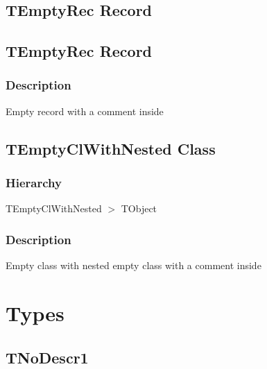\documentclass{report}
\newif\ifpdf
\begin{document}
\subsection*{\large{\textbf{TEmptyRec Record}}\normalsize\hspace{1ex}\hrulefill}
\else
\subsection*{TEmptyRec Record}
\fi
\label{ok_no_comments_outside_class.TEmptyRec}
\subsubsection*{\large{\textbf{Description}}\normalsize\hspace{1ex}\hfill}
Empty record with a comment inside\ifpdf
\subsection*{\large{\textbf{TEmptyClWithNested Class}}\normalsize\hspace{1ex}\hrulefill}
\else
\subsection*{TEmptyClWithNested Class}
\fi
\label{ok_no_comments_outside_class.TEmptyClWithNested}
\subsubsection*{\large{\textbf{Hierarchy}}\normalsize\hspace{1ex}\hfill}
TEmptyClWithNested {$>$} TObject
\subsubsection*{\large{\textbf{Description}}\normalsize\hspace{1ex}\hfill}
Empty class with nested empty class with a comment inside\section{Types}
\ifpdf
\subsection*{\large{\textbf{TNoDescr1}}\normalsize\hspace{1ex}\hrulefill}
\else
\end{document}
